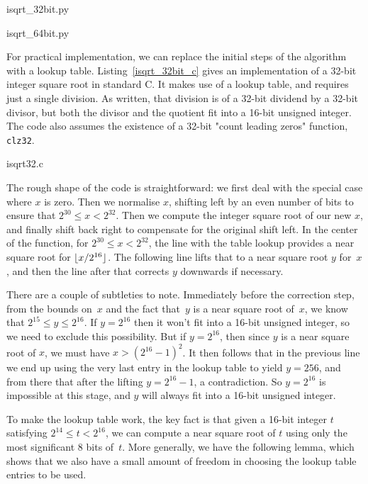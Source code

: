 \documentclass[a4paper]{article}
\DeclarePairedDelimiter\floor{\lfloor}{\rfloor}
\theoremstyle{plain}
\theoremstyle{definition}
\begin{document}

  {isqrt_32bit.py}


  {isqrt_64bit.py}

For practical implementation, we can replace the initial steps of the algorithm
with a lookup table. Listing~\ref{isqrt_32bit_c} gives an implementation of a
32-bit integer square root in standard C. It makes use of a lookup table, and
requires just a single division. As written, that division is of a 32-bit
dividend by a 32-bit divisor, but both the divisor and the quotient fit into a
16-bit unsigned integer. The code also assumes the existence of a 32-bit "count
leading zeros" function, \lstinline$clz32$.


  {isqrt32.c}

The rough shape of the code is straightforward: we first deal with
the special case where $x$ is zero. Then we normalise $x$, shifting left
by an even number of bits to ensure that $2^{30} \le x < 2^{32}$. Then
we compute the integer square root of our new $x$, and finally shift back
right to compensate for the original shift left. In the center of the function,
for $2^{30} \le x < 2^{32}$, the line with the table lookup provides a near
square root for $\floor{x / 2^{16}}$. The following line lifts that to a near
square root $y$ for~$x$, and then the line after that corrects $y$ downwards if
necessary.

There are a couple of subtleties to note. Immediately before the correction
step, from the bounds on~$x$ and the fact that~$y$ is a near square root
of~$x$, we know that $2^{15} \le y \le 2^{16}$. If $y = 2^{16}$ then it
won't fit into a 16-bit unsigned integer, so we need to exclude this
possibility. But if $y = 2^{16}$, then since $y$ is a near square root of $x$,
we must have $x > (2^{16} - 1)^2$. It then follows that in the previous line we
end up using the very last entry in the lookup table to yield $y = 256$, and
from there that after the lifting $y = 2^{16} - 1$, a contradiction. So $y =
2^{16}$ is impossible at this stage, and $y$ will always fit into a 16-bit
unsigned integer.

To make the lookup table work, the key fact is that given a 16-bit integer $t$
satisfying $2^{14} \le t < 2^{16}$, we can compute a near square root of $t$
using only the most significant 8 bits of~$t$. More generally, we have the
following lemma, which shows that we also have a small amount of freedom in
choosing the lookup table entries to be used.
\end{document}
